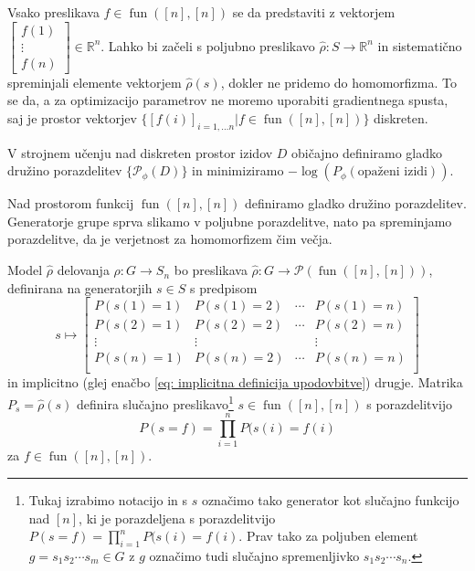 \documentclass[mat2, tisk]{fmfdelo}
\newcommand{\R}{\mathbb R}
\newcommand{\fun}{\operatorname{fun}}
\newcommand{\funnn}[1]{\fun([#1], [#1])}
\begin{document}
          Vsako preslikava $f \in \funnn{n}$ se da predstaviti z vektorjem $
          \begin{bmatrix}
            f(1)\\
            \vdots \\
            f(n)
          \end{bmatrix} \in \R^n$. Lahko bi začeli s poljubno
          preslikavo $\hat \rho \colon S \to \R^n$ in sistematično
          spreminjali elemente vektorjem $\hat\rho(s)$, dokler ne
          pridemo do homomorfizma. To se da, a za optimizacijo
          parametrov ne moremo uporabiti gradientnega spusta, saj je
          prostor vektorjev $\{[f(i)]_{i=1, \dotsc n} | f \in
          \funnn{n}\}$ diskreten.

          V strojnem učenju nad diskreten prostor izidov $D$ običajno
          definiramo gladko družino porazdelitev
          $\{\mathcal{P}_\phi(D)\}$ in minimiziramo  $-\log(P_\phi
          (\text{opaženi izidi}))$.

          Nad prostorom funkcij $\funnn{n}$ definiramo gladko družino
          porazdelitev. Generatorje grupe sprva slikamo v poljubne
          porazdelitve, nato pa spreminjamo porazdelitve, da je
          verjetnost za homomorfizem čim večja.

          Model $\hat \rho$ delovanja $\rho \colon G \to S_n$ bo
          preslikava $\hat \rho \colon G \to \mathcal{P}(\funnn{n})$,
          definirana na generatorjih $s \in S$ s predpisom
          \begin{equation}
            \label{eq: model za delovanja}
            s \mapsto
            \begin{bmatrix}
              P(s(1) = 1) & P(s(1) = 2) & \dotsm & P(s(1) = n) \\
              P(s(2) = 1) & P(s(2) = 2) & \dotsm & P(s(2) = n) \\
              \vdots & \vdots & & \vdots \\
              P(s(n) = 1) & P(s(n) = 2) & \dotsm & P(s(n) = n) \\
            \end{bmatrix}
          \end{equation}
          in implicitno (glej enačbo  \eqref{eq: implicitna
          definicija upodovbitve}) drugje. Matrika $P_s =
          \hat\rho(s)$ definira slučajno preslikavo\footnote{Tukaj
            izrabimo notacijo in s $s$ označimo tako generator  kot
            slučajno funkcijo nad $[n]$, ki je porazdeljena s
            porazdelitvijo $P(s = f) = \prod _{i=1}^n P(s(i) = f(i)$.
              Prav tako za poljuben element $g=s_1s_2\dotsm s_m \in G$
            z $g$ označimo tudi slučajno spremenljivko $s_1 s_2 \dotsm s_n$.}
            $s \in \funnn{n}$ s porazdelitvijo
            $$P(s = f) = \prod _{i=1}^n P(s(i) = f(i)$$
              za $f \in \funnn{n}$.
\end{document}
